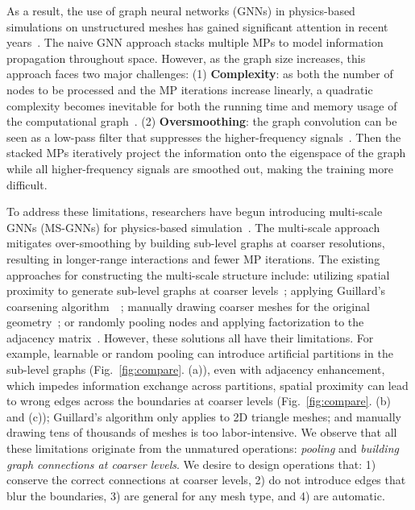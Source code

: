 As a result, the use of graph neural networks (GNNs) in physics-based simulations on unstructured meshes has gained significant attention in recent years~\cite{battaglia2018relational,sanchez2018graph,belbute2020combining,pfaff2020learning,sanchez2020learning,harsch2021direct,gao2022physics}.
The naive GNN approach stacks multiple MPs to model information propagation throughout space. However, as the graph size increases, this approach faces two major challenges:
(1) \textbf{Complexity}: as both the number of nodes to be processed and the MP iterations increase linearly, a quadratic complexity becomes inevitable for both the running time and memory usage of the computational graph~\cite{fortunato2022multiscale}.
(2) \textbf{Oversmoothing}: the graph convolution can be seen as a low-pass filter that suppresses the higher-frequency signals~\cite{chen2020measuring, li2020multipole}. Then the stacked MPs iteratively project the information onto the eigenspace of the graph while all higher-frequency signals are smoothed out, making the training more difficult.

To address these limitations, researchers have begun introducing multi-scale GNNs (MS-GNNs) for physics-based simulation~\cite{li2020multipole,liu2021multi,lino2021simulating,fortunato2022multiscale,lino2022multi,lino2022towards}. The multi-scale approach mitigates over-smoothing by building sub-level graphs at coarser resolutions, resulting in longer-range interactions and fewer MP iterations.
The existing approaches for constructing the multi-scale structure include: utilizing spatial proximity to generate sub-level graphs at coarser levels~\cite{lino2021simulating,liu2021multi,lino2022towards}; applying Guillard's coarsening algorithm~\cite{guillard1993node}~\cite{lino2022multi}; manually drawing coarser meshes for the original geometry~\cite{liu2021multi,fortunato2022multiscale}; or randomly pooling nodes and applying factorization to the adjacency matrix~\cite{li2020multipole}. However, these solutions all have their limitations.
For example, learnable or random pooling can introduce artificial partitions in the sub-level graphs (Fig.~\ref{fig:compare}. (a)), even with adjacency enhancement, which impedes information exchange across partitions, spatial proximity can lead to wrong edges across the boundaries at coarser levels (Fig.~\ref{fig:compare}. (b) and (c)); Guillard's algorithm only applies to 2D triangle meshes; and manually drawing tens of thousands of meshes is too labor-intensive.
We observe that all these limitations originate from the unmatured operations: \textit{pooling} and \textit{building graph connections at coarser levels}. We desire to design operations that: 1) conserve the correct connections at coarser levels, 2) do not introduce edges that blur the boundaries, 3) are general for any mesh type, and 4) are automatic.


